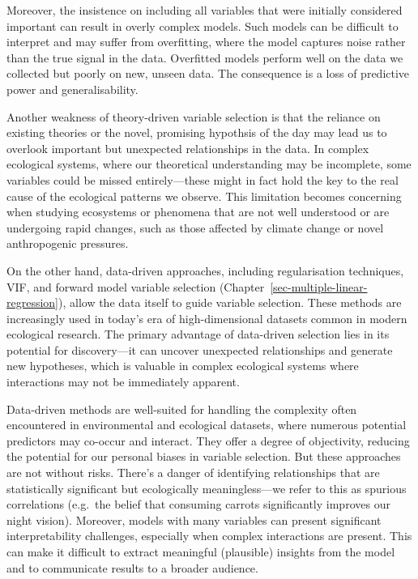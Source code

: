 \documentclass[
  letterpaper,
]{book}
\begin{document}
Moreover, the insistence on including all variables that were initially
considered important can result in overly complex models. Such models
can be difficult to interpret and may suffer from overfitting, where the
model captures noise rather than the true signal in the data. Overfitted
models perform well on the data we collected but poorly on new, unseen
data. The consequence is a loss of predictive power and
generalisability.

Another weakness of theory-driven variable selection is that the
reliance on existing theories or the novel, promising hypothsis of the
day may lead us to overlook important but unexpected relationships in
the data. In complex ecological systems, where our theoretical
understanding may be incomplete, some variables could be missed
entirely---these might in fact hold the key to the real cause of the
ecological patterns we observe. This limitation becomes concerning when
studying ecosystems or phenomena that are not well understood or are
undergoing rapid changes, such as those affected by climate change or
novel anthropogenic pressures.

On the other hand, data-driven approaches, including regularisation
techniques, VIF, and forward model variable selection
(Chapter~\ref{sec-multiple-linear-regression}), allow the data itself to
guide variable selection. These methods are increasingly used in today's
era of high-dimensional datasets common in modern ecological research.
The primary advantage of data-driven selection lies in its potential for
discovery---it can uncover unexpected relationships and generate new
hypotheses, which is valuable in complex ecological systems where
interactions may not be immediately apparent.

Data-driven methods are well-suited for handling the complexity often
encountered in environmental and ecological datasets, where numerous
potential predictors may co-occur and interact. They offer a degree of
objectivity, reducing the potential for our personal biases in variable
selection. But these approaches are not without risks. There's a danger
of identifying relationships that are statistically significant but
ecologically meaningless---we refer to this as spurious correlations
(e.g.~the belief that consuming carrots significantly improves our night
vision). Moreover, models with many variables can present significant
interpretability challenges, especially when complex interactions are
present. This can make it difficult to extract meaningful (plausible)
insights from the model and to communicate results to a broader
audience.
\end{document}
